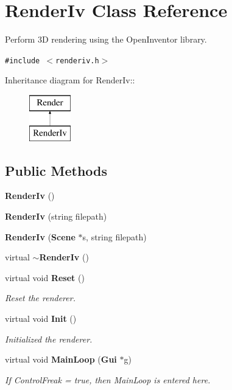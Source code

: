 \section{Render\-Iv  Class Reference}
\label{class_RenderIv}
Perform 3D rendering using the Open\-Inventor library. 


{\tt \#include $<$renderiv.h$>$}

Inheritance diagram for Render\-Iv::\begin{figure}[H]
\begin{center}
\leavevmode
\includegraphics[height=2cm]{class_RenderIv}
\end{center}
\end{figure}
\subsection*{Public Methods}
\begin{CompactItemize}
\item 
{\bf Render\-Iv} ()
\item 
{\bf Render\-Iv} (string filepath)
\item 
{\bf Render\-Iv} ({\bf Scene} $\ast$s, string filepath)
\item 
virtual {\bf $\sim$Render\-Iv} ()
\item 
virtual void {\bf Reset} ()
\begin{CompactList}\small\item\em Reset the renderer.\item\end{CompactList}\item 
virtual void {\bf Init} ()
\begin{CompactList}\small\item\em Initialized the renderer.\item\end{CompactList}\item 
virtual void {\bf Main\-Loop} ({\bf Gui} $\ast$g)
\begin{CompactList}\small\item\em If Control\-Freak = true, then Main\-Loop is entered here.\item\end{CompactList}\end{CompactItemize}
